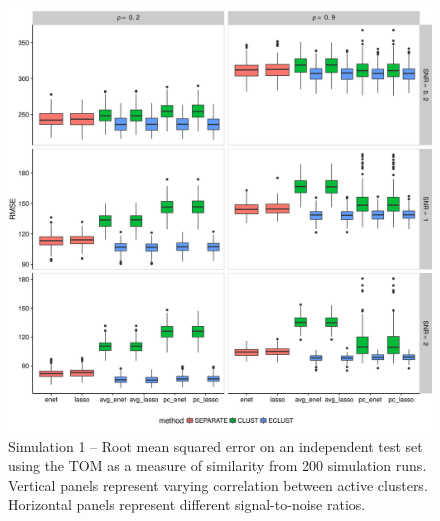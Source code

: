 \begin{appendices}
\begin{figure}[H]
	\centering
	\includegraphics[scale=0.6, keepaspectratio]{./figs/hydra/results/figures/sim1-sept10/RMSE_TOM_sim1.png}
	\caption{Simulation 1 -- Root mean squared error on an independent test set using the TOM as a measure of similarity from 200 simulation runs. Vertical panels represent varying correlation between active clusters. Horizontal panels represent different signal-to-noise ratios.}
	\label{fig:RMSE_TOM_sim1}
\end{figure}


\end{appendices}
